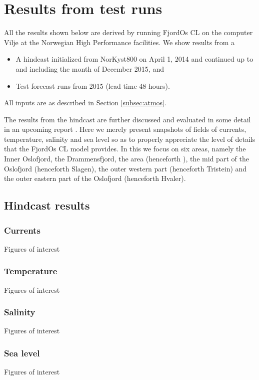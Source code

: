 \section{Results from test runs}
\label{sec:resul}
All the results shown below are derived by running FjordOs CL on the computer Vilje at the Norwegian High Performance facilities. We show results from a 
\begin{itemize}
	\item A hindcast initialized from NorKyst800 on April 1, 2014 and continued up to and including the month of December 2015, and 
	\item Test forecast runs from 2015 (lead time 48 hours). 
\end{itemize}
All inputs are as described in Section \ref{subsec:atmos}.
 
The results from the hindcast are further discussed and evaluated in some detail in an upcoming report \citep{hjelm:etal:2016}. Here we merely present snapshots of fields of currents, temperature, salinity and sea level so as to properly appreciate the level of details that the FjordOs CL model provides. In this we focus on six areas, namely the Inner Oslofjord, the Drammensfjord, the {\DR} area (henceforth {\DR}), the mid part of the Oslofjord (henceforth Slagen), the outer western part (henceforth Tristein) and the outer eastern part of the Oslofjord (henceforth Hvaler). 

\subsection{Hindcast results}

\subsubsection{Currents}
 Figures of interest 

\subsubsection{Temperature}
Figures of interest 

\subsubsection{Salinity}
Figures of interest 

\subsubsection{Sea level}
Figures of interest 

